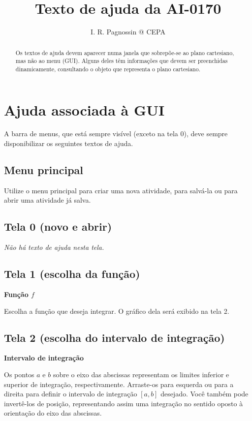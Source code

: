 \documentclass[a4paper,10pt]{scrartcl}
\title{Texto de ajuda da AI-0170}
\author{I. R. Pagnossin @ CEPA}
\begin{document}
\maketitle

  \begin{abstract}
    Os textos de ajuda devem aparecer numa janela que sobrepõe-se ao plano cartesiano, mas não ao menu (GUI). Alguns deles têm informações que devem ser preenchidas dinamicamente, consultando o objeto que representa o plano cartesiano.
  \end{abstract}

  \section*{Ajuda associada à GUI}
    A barra de menus, que está sempre visível (exceto na tela 0), deve sempre disponibilizar os seguintes textos de ajuda.
	
  \subsection*{Menu principal}
    Utilize o menu principal para criar uma nova atividade, para salvá-la ou para abrir uma atividade já salva.

  \subsection*{Tela 0 (novo e abrir)}
    \textit{Não há texto de ajuda nesta tela.}
	
  \subsection*{Tela 1 (escolha da função)}
    \textbf{Função $f$}

    Escolha a função que deseja integrar. O gráfico dela será exibido na tela 2.

  \newpage
    
  \subsection*{Tela 2 (escolha do intervalo de integração)}
    \textbf{Intervalo de integração}

    Os pontos $a$ e $b$ sobre o eixo das abscissas representam os limites inferior e superior de integração, respectivamente. Arraste-os para esquerda ou para a direita para definir o intervalo de integração $[a,b]$ desejado. Você também pode invertê-los de posição, representando assim uma integração no sentido oposto à orientação do eixo das abscissas.
\end{document}
